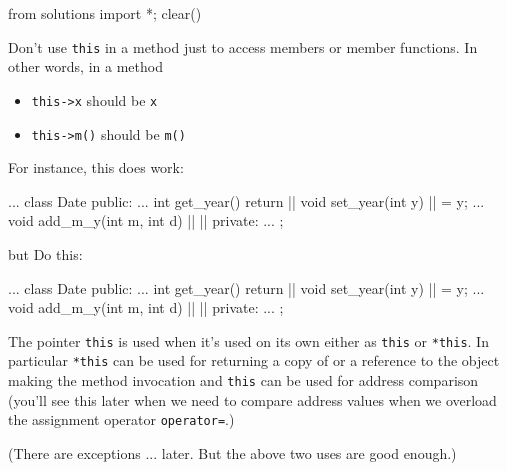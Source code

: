 \begin{python0}
from solutions import *; clear()
\end{python0}

 Don't use \texttt{this} in a method just to access members or member functions. In other words, in a method

\begin{itemize}
\item \texttt{this->x} should be \texttt{x}
\item \texttt{this->m()} should be \texttt{m()}
\end{itemize}

For instance, this does work:

\begin{consolethree}[escapeinside=||]
...
class Date
{
public:
    ...
    int get_year()
    {
        return ||
    }
    void set_year(int y)
    {
        || = y;
    }
    ...
    void add_m_y(int m, int d)
    {
        ||
        ||
    }
private:
    ...
};
\end{consolethree}

but  Do this:

\begin{consolethree}[escapeinside=||]
...
class Date
{
public:
    ...
    int get_year()
    {
        return ||
    }
    void set_year(int y)
    {
        || = y;
    }
    ...
    void add_m_y(int m, int d)
    {
        ||
        ||
    }
private:
    ...
};
\end{consolethree}

The pointer \texttt{this} is used when it's used on its own either as
\texttt{this} or \texttt{*this}. In particular \texttt{*this} can be used for
returning a copy of or a reference to the object making the method
invocation and \texttt{this} can be used for address comparison
(you'll see this later when we need to compare address
values when we overload the assignment operator \texttt{operator=}.)

(There are exceptions ... later. But the above two uses are good
enough.)


